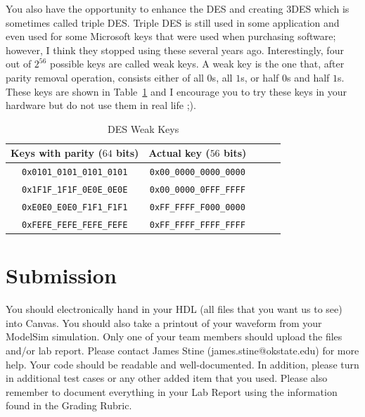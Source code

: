 \documentclass{article}
\begin{document}
You also have the opportunity to enhance the DES and creating 3DES
which is sometimes called triple DES.  Triple DES is still used in
some application and even used for some Microsoft keys that were used
when purchasing software; however, I think they stopped using these
several years ago.  Interestingly, four out of
$2^{56}$ possible keys are called weak keys.
A weak key is the one that, after parity removal operation,
consists either of all $0$s, all $1$s, or half $0$s and half $1$s.
These keys are shown in Table~\ref{weak.tbl} and I encourage you to
try these keys in your hardware but do not use them in real life ;).
\begin{table}
  \centering
  \begin{tabular}{|c|c|c|c|c|}\hline
    Keys with parity ($64$ bits) & Actual key ($56$ bits)
    \\ \hline \hline
    \verb!0x0101_0101_0101_0101! & \verb!0x00_0000_0000_0000! \\ \hline
    \verb!0x1F1F_1F1F_0E0E_0E0E! & \verb!0x00_0000_0FFF_FFFF! \\ \hline
    \verb!0xE0E0_E0E0_F1F1_F1F1! & \verb!0xFF_FFFF_F000_0000! \\ \hline
    \verb!0xFEFE_FEFE_FEFE_FEFE! & \verb!0xFF_FFFF_FFFF_FFFF! \\ \hline
  \end{tabular}
  \caption{DES Weak Keys}
  \label{weak.tbl}
  \end{table}


\section{Submission}

You should electronically hand in your HDL (all files that you want
us to see) into Canvas.
You should also take a printout of your waveform 
from your ModelSim simulation.  
Only one of your team members should upload
the files and/or lab report. Please contact
James Stine
(james.stine@okstate.edu) 
for more help.  Your
code should be
readable and well-documented. In addition, please turn in additional
test cases or any other added item that you used. 
Please also remember to document everything in your Lab Report using
the information found in the Grading Rubric.


    


\end{document}
